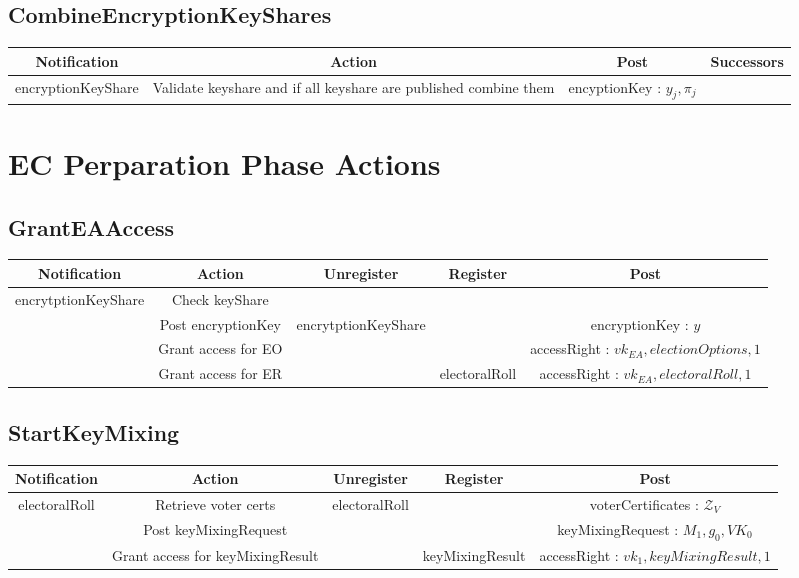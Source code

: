 \documentclass[bibtotoc,halfparskip,oneside]{scrreprt}
\begin{document}
\begin{landscape}
\subsection{CombineEncryptionKeyShares}
\begin{tabularx}{\linewidth}{|c|c|c|X|}
\hline Notification & Action & Post & Successors\\  
\hline  encryptionKeyShare & Validate keyshare and if all keyshare are published combine them & encyptionKey : $y_j, \pi_j $ &   \\ 
\hline 
\end{tabularx}

\section{EC Perparation Phase Actions}
\subsection{GrantEAAccess}
\begin{tabular}{|c|c|c|c|c|}
\hline Notification & Action & Unregister & Register & Post \\ 
\hline encrytptionKeyShare & Check keyShare & & & \\ 
\hline & Post encryptionKey & encrytptionKeyShare & & encryptionKey : $y$  \\ 
& Grant access for EO & & & accessRight : $vk_{EA}, electionOptions , 1 $ \\
& Grant access for ER & & electoralRoll & accessRight : $vk_{EA}, electoralRoll , 1 $ \\ 
\hline 
\end{tabular}

\subsection{StartKeyMixing}
\begin{tabular}{|c|c|c|c|c|}
\hline Notification & Action & Unregister & Register & Post \\ 
\hline electoralRoll & Retrieve voter certs & electoralRoll &  & voterCertificates : $\mathcal{Z}_V$ \\ 
 & Post keyMixingRequest & & & keyMixingRequest : $M_1,g_0, VK_0 $  \\
 & Grant access for keyMixingResult & & keyMixingResult & accessRight : $vk_1, keyMixingResult , 1 $  \\
\hline 
\end{tabular}


\end{landscape}
\end{document}
